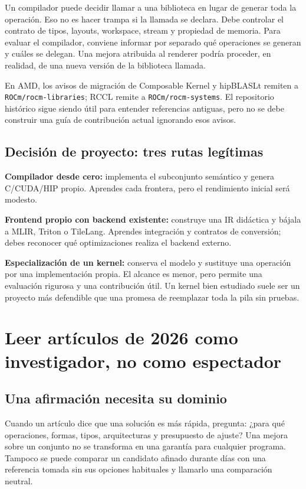 \documentclass[12pt,a4paper,oneside]{report}
\begin{document}
Un compilador puede decidir llamar a una biblioteca en lugar de generar toda la operación. Eso no es hacer trampa si la llamada se declara. Debe controlar el contrato de tipos, layouts, workspace, stream y propiedad de memoria. Para evaluar el compilador, conviene informar por separado qué operaciones se generan y cuáles se delegan. Una mejora atribuida al renderer podría proceder, en realidad, de una nueva versión de la biblioteca llamada.

En AMD, los avisos de migración de Composable Kernel y hipBLASLt remiten a \texttt{ROCm/rocm-libraries}; RCCL remite a \texttt{ROCm/rocm-systems}. El repositorio histórico sigue siendo útil para entender referencias antiguas, pero no se debe construir una guía de contribución actual ignorando esos avisos. \cite{ck,hipblaslt,rccl}

\section{Decisión de proyecto: tres rutas legítimas}
\textbf{Compilador desde cero:} implementa el subconjunto semántico y genera C/CUDA/HIP propio. Aprendes cada frontera, pero el rendimiento inicial será modesto.

\textbf{Frontend propio con backend existente:} construye una IR didáctica y bájala a MLIR, Triton o TileLang. Aprendes integración y contratos de conversión; debes reconocer qué optimizaciones realiza el backend externo.

\textbf{Especialización de un kernel:} conserva el modelo y sustituye una operación por una implementación propia. El alcance es menor, pero permite una evaluación rigurosa y una contribución útil. Un kernel bien estudiado suele ser un proyecto más defendible que una promesa de reemplazar toda la pila sin pruebas.

\chapter{Leer artículos de 2026 como investigador, no como espectador}
\label{ch:articulos-2026}
\section{Una afirmación necesita su dominio}
Cuando un artículo dice que una solución es más rápida, pregunta: ¿para qué operaciones, formas, tipos, arquitecturas y presupuesto de ajuste? Una mejora sobre un conjunto no se transforma en una garantía para cualquier programa. Tampoco se puede comparar un candidato afinado durante días con una referencia tomada sin sus opciones habituales y llamarlo una comparación neutral.
\end{document}
